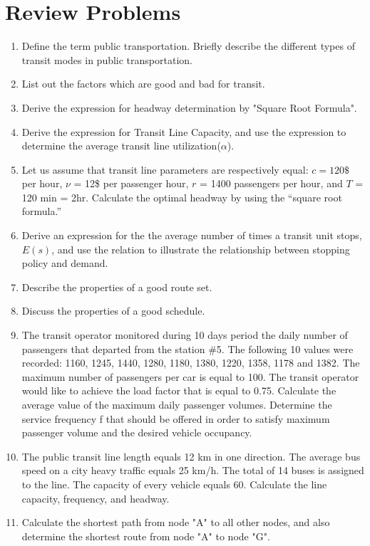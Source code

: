 \section{Review Problems}
\begin{enumerate}
	\item Define the term public transportation. Briefly describe the different types of transit modes in public transportation.
	\item List out the factors which are good and bad for transit.
	\item Derive the expression for headway determination by "Square Root Formula".
	\item Derive the expression for Transit Line Capacity, and use the expression to determine the average transit line utilization($\alpha$).
	\item Let us assume that transit line parameters are respectively equal: $ c = 120\$ $ per hour, $\nu$ = 12\$ per passenger hour, $r$ = 1400 passengers per hour, and $T$ = 120 min = 2hr. Calculate the optimal headway by using the “square root formula.”
	\item Derive an expression for the the average number of times a transit
	unit stops, $ E(s) $, and use the relation to illustrate the relationship between stopping policy and demand.
	\item Describe the properties of a good route set.
	\item Discuss the properties of a good schedule.
	\item The transit operator monitored during 10 days period the daily number of passengers that departed from the station \#5. The following 10 values were recorded: 1160, 1245, 1440, 1280, 1180, 1380, 1220, 1358, 1178 and 1382. The maximum number of passengers per car is equal to 100. The transit operator would like to achieve the load factor that is equal to 0.75. Calculate the average value of the maximum daily passenger volumes. Determine the service frequency f that should be offered in order to satisfy maximum passenger volume and the desired vehicle occupancy.
	\item The public transit line length equals 12 km in one direction. The average bus speed on a city heavy traffic equals 25 km/h. The total of 14 buses is assigned to the line. The capacity of every vehicle equals 60. Calculate the line capacity, frequency, and headway.
	\item Calculate the shortest path from node "A" to all other nodes, and also determine the shortest route from node "A" to node "G".

\end{enumerate}
